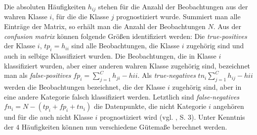 \documentclass[a4paper,11pt]{article}
\begin{document}
Die absoluten Häufigkeiten $h_{ij}$ stehen für die Anzahl der Beobachtungen aus der wahren Klasse $i$, für die die Klasse $j$ prognostiziert wurde. Summiert man alle Einträge der Matrix, so erhält man die Anzahl der Beobachtungen $N$. Aus der \textit{confusion matrix} können folgende Größen identifiziert werden: Die \textit{true-positives} der Klasse $i$, $tp_i = h_{ii}$ sind alle Beobachtungen, die Klasse $i$ zugehörig sind und auch in selbige Klassifiziert wurden. Die Beobachtungen, die in Klasse $i$ klassifiziert wurden, aber einer anderen wahren Klasse zugehörig sind, bezeichnet man als \textit{false-positives} $fp_i = \sum_{j = 1}^C h_{ji} - h{ii}$. Als \textit{true-negatives} $tn_i \sum_{j = 1}^C h_{ij} - h{ii}$ werden die Beobachtungen bezeichnet, die der Klasse $i$ zugehörig sind, aber in eine andere Kategorie falsch klassifiziert werden. Letztlich sind \textit{false-negatives} $fn_i = N - (tp_i + fp_i + tn_i)$ die Datenpunkte, die nicht Kategorie $i$ angehören und für die auch nicht Klasse $i$ prognostiziert wird (vgl. \cite{sokolova}, S. 3). Unter Kenntnis der $4$ Häufigkeiten können nun verschiedene Gütemaße berechnet werden. 
\end{document}

